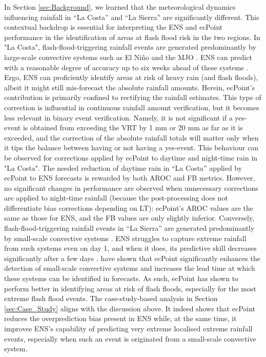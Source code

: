 \documentclass[techmemo]{ecmwfrep}%
\begin{document}
In Section \ref{sec:Background}, we learned that the meteorological dynamics influencing rainfall in “La Costa” and “La Sierra” are significantly different. This contextual backdrop is essential for interpreting the ENS and ecPoint performance in the identification of areas at flash flood risk in the two regions. In "La Costa", flash-flood-triggering rainfall events are generated predominantly by large-scale convective systems such as El Niño and the MJO \citep{Recalde-Coronel2020, Tobar2018}. ENS can predict with a reasonable degree of accuracy up to six weeks ahead of these systems \citep{Haiden2021}. Ergo, ENS can proficiently identify areas at risk of heavy rain (and flash floods), albeit it might still mis-forecast the absolute rainfall amounts. Herein, ecPoint’s contribution is primarily confined to rectifying the rainfall estimates. This type of correction is influential in continuous rainfall amount verification, but it becomes less relevant in binary event verification. Namely, it is not significant if a yes-event is obtained from exceeding the VRT by 1 mm or 20 mm as far as it is exceeded, and the correction of the absolute rainfall totals will matter only when it tips the balance between having or not having a yes-event. This behaviour can be observed for corrections applied by ecPoint to daytime and night-time rain in "La Costa". The needed reduction of daytime rain in “La Costa” applied by ecPoint to ENS forecasts is rewarded by both AROC and FB metrics. However, no significant changes in performance are observed when unnecessary corrections are applied to night-time rainfall (because the post-processing does not differentiate bias corrections depending on LT): ecPoint’s AROC values are the same as those for ENS, and the FB values are only slightly inferior. Conversely, flash-flood-triggering rainfall events in “La Sierra” are generated predominantly by small-scale convective systems \citep{Recalde-Coronel2014}. ENS struggles to capture extreme rainfall from such systems even on day 1, and when it does, its predictive skill decreases significantly after a few days \citep{Haiden2023}. \cite{Hewson2021} have shown that ecPoint significantly enhances the detection of small-scale convective systems and increases the lead time at which these systems can be identified in forecasts. As such, ecPoint has shown to perform better in identifying areas at risk of flash floods, especially for the most extreme flash flood events. The case-study-based analysis in Section \ref{sec:Case_Study} aligns with the discussion above. It indeed shows that ecPoint reduces the overprediction bias present in ENS while, at the same time, it improves ENS’s capability of predicting very extreme localised extreme rainfall events, especially when such an event is originated from a small-scale convective system.
\end{document}
